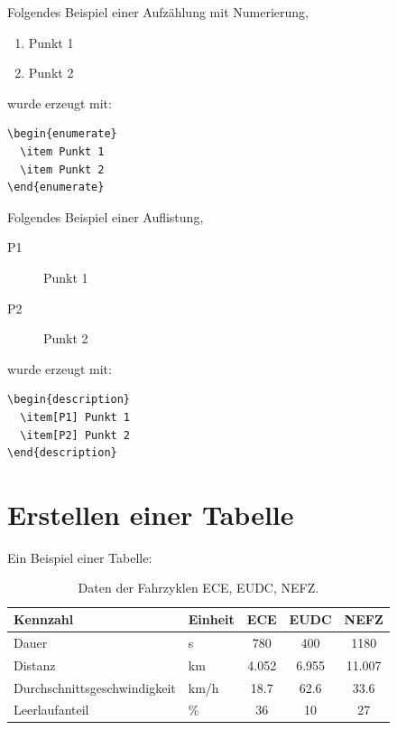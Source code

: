 Folgendes Beispiel einer Aufzählung mit Numerierung,
\begin{enumerate}
  \item Punkt 1
  \item Punkt 2
\end{enumerate}
wurde erzeugt mit:
\begin{verbatim}
\begin{enumerate}
  \item Punkt 1
  \item Punkt 2
\end{enumerate}
\end{verbatim}

Folgendes Beispiel einer Auflistung,
\begin{description}
  \item[P1] Punkt 1
  \item[P2] Punkt 2
\end{description}
wurde erzeugt mit:
\begin{verbatim}
\begin{description}
  \item[P1] Punkt 1
  \item[P2] Punkt 2
\end{description}
\end{verbatim}


\section{Erstellen einer Tabelle}\label{sec:tabellen}

Ein Beispiel einer Tabelle:
\begin{table}[h]
\begin{center}
 \caption{Daten der Fahrzyklen ECE, EUDC, NEFZ.}\vspace{1ex}
 \label{tab:tabnefz}
 \begin{tabular}{ll|ccc}
 \hline
 Kennzahl & Einheit & ECE & EUDC & NEFZ \\ \hline \hline
 Dauer & s & 780 & 400 & 1180 \\
 Distanz & km & 4.052 & 6.955 & 11.007 \\
 Durchschnittsgeschwindigkeit & km/h & 18.7 &  62.6 & 33.6 \\
 Leerlaufanteil & \% & 36 & 10 & 27 \\
 \hline
 \end{tabular}
\end{center}
\end{table}

